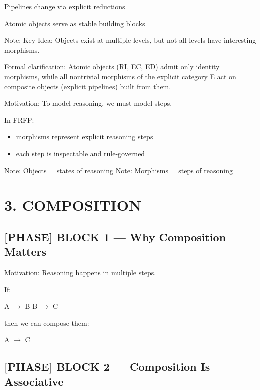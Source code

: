 Pipelines change via explicit reductions\par

Atomic objects serve as stable building blocks\par

Note: Key Idea: Objects exist at multiple levels, but not all levels have interesting morphisms.\par

Formal clarification: Atomic objects (RI, EC, ED) admit only identity morphisms, while all nontrivial morphisms of the explicit category E act on composite objects (explicit pipelines) built from them.\par

Motivation: To model reasoning, we must model steps.\par

In FRFP:\n\n\begin{itemize}\n\item morphisms represent explicit reasoning steps
\item each step is inspectable and rule-governed\n\end{itemize}

Note: Objects = states of reasoning
Note: Morphisms = steps of reasoning\par

\section*{3. COMPOSITION}

\subsection*{[PHASE] BLOCK 1 --- Why Composition Matters}

Motivation: Reasoning happens in multiple steps.\par

If:\par

A $\to$ B
B $\to$ C\par

then we can compose them:\par

A $\to$ C\par

\subsection*{[PHASE] BLOCK 2 --- Composition Is Associative}

